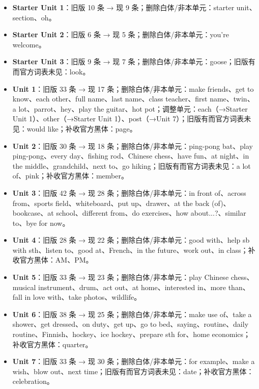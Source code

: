 \documentclass[UTF8,a4paper,11pt,oneside]{ctexbook}
\begin{document}
\begin{itemize}[leftmargin=2.2em,itemsep=0.25ex,topsep=0.3ex,label={\textcolor{mainblue}{\small\textbullet}}]
\item \textbf{\textcolor{mainblue}{Starter Unit 1}}：旧版 10 条 → 现 9 条；删除白体/非本单元：starter unit、section、oh。
\item \textbf{\textcolor{mainblue}{Starter Unit 2}}：旧版 6 条 → 现 5 条；删除白体/非本单元：you're welcome。
\item \textbf{\textcolor{mainblue}{Starter Unit 3}}：旧版 9 条 → 现 7 条；删除白体/非本单元：goose；旧版有而官方词表未见：look。
\item \textbf{\textcolor{mainblue}{Unit 1}}：旧版 33 条 → 现 17 条；删除白体/非本单元：make friends、get to know、each other、full name、last name、class teacher、first name、twin、a lot、parrot、hey、play the guitar、hot pot；调整单元：each（→Starter Unit 1）、other（→Starter Unit 1）、post（→Unit 7）；旧版有而官方词表未见：would like；补收官方黑体：page。
\item \textbf{\textcolor{mainblue}{Unit 2}}：旧版 30 条 → 现 18 条；删除白体/非本单元：ping-pong bat、play ping-pong、every day、fishing rod、Chinese chess、have fun、at night、in the middle、grandchild、next to、go hiking；旧版有而官方词表未见：a lot of、pink；补收官方黑体：member。
\item \textbf{\textcolor{mainblue}{Unit 3}}：旧版 42 条 → 现 28 条；删除白体/非本单元：in front of、across from、sports field、whiteboard、put up、drawer、at the back (of)、bookcase、at school、different from、do exercises、how about...?、similar to、bye for now。
\item \textbf{\textcolor{mainblue}{Unit 4}}：旧版 28 条 → 现 22 条；删除白体/非本单元：good with、help sb with sth、listen to、good at、French、in the future、work out、in class；补收官方黑体：AM、PM。
\item \textbf{\textcolor{mainblue}{Unit 5}}：旧版 33 条 → 现 23 条；删除白体/非本单元：play Chinese chess、musical instrument、drum、act out、at home、interested in、more than、fall in love with、take photos、wildlife。
\item \textbf{\textcolor{mainblue}{Unit 6}}：旧版 38 条 → 现 25 条；删除白体/非本单元：make use of、take a shower、get dressed、on duty、get up、go to bed、saying、routine、daily routine、Finnish、hockey、ice hockey、prepare sth for、home economics；补收官方黑体：quarter。
\item \textbf{\textcolor{mainblue}{Unit 7}}：旧版 33 条 → 现 30 条；删除白体/非本单元：for example、make a wish、blow out、next time；旧版有而官方词表未见：date；补收官方黑体：celebration。
\end{itemize}
\end{document}
